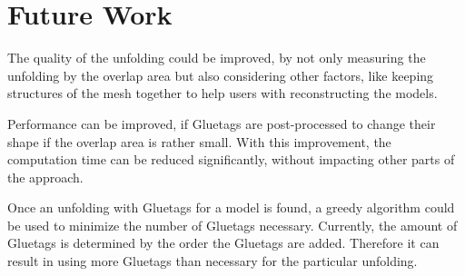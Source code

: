 \documentclass[draft,final]{vutinfth} %
\begin{document}
\section{Future Work}
The quality of the unfolding could be improved, by not only measuring the unfolding by the overlap area but also considering other factors, like keeping structures of the mesh together to help users with reconstructing the models.

Performance can be improved, if Gluetags are post-processed to change their shape if the overlap area is rather small. With this improvement, the computation time can be reduced significantly, without impacting other parts of the approach.

Once an unfolding with Gluetags for a model is found, a greedy algorithm could be used to minimize the number of Gluetags necessary. Currently, the amount of Gluetags is determined by the order the Gluetags are added. Therefore it can result in using more Gluetags than necessary for the particular unfolding.
\backmatter

\listoffigures %

\cleardoublepage %
\listoftables %

\listofalgorithms
{}

\printindex

\printglossaries



\end{document}
